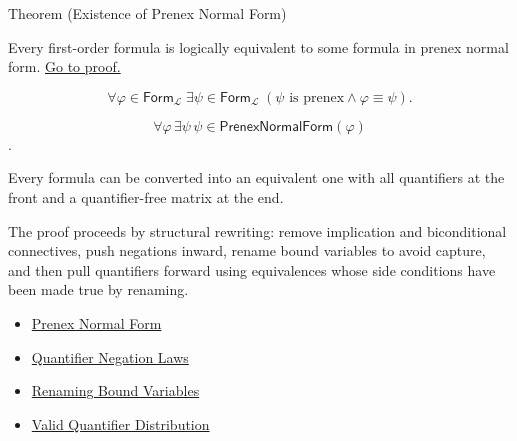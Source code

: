 \begin{theorembox}{Theorem (Existence of Prenex Normal Form)}
\begin{theorem}
\label{thm:pnf}
Every first-order formula is logically equivalent to some formula in prenex
normal form.
\hyperref[prf:pnf]{Go to proof.}
\end{theorem}
\end{theorembox}

\begin{remark*}
\[
\forall \varphi\in\mathsf{Form}_{\mathcal L}\;
\exists \psi\in\mathsf{Form}_{\mathcal L}\;
(\psi \text{ is prenex}\land \varphi\equiv\psi).
\]
\end{remark*}

\begin{remark*}
\[
\forall\varphi\,
\exists\psi\,\psi\in\mathsf{PrenexNormalForm}(\varphi)
\].
\end{remark*}

\begin{remark*}[Interpretation]
Every formula can be converted into an equivalent one with all quantifiers at
the front and a quantifier-free matrix at the end.
\end{remark*}

\begin{remark*}[Exposition]
The proof proceeds by structural rewriting: remove implication and
biconditional connectives, push negations inward, rename bound variables to
avoid capture, and then pull quantifiers forward using equivalences whose side
conditions have been made true by renaming.
\end{remark*}

\begin{dependencies}
\begin{itemize}
  \item \hyperref[def:pnf]{Prenex Normal Form}
  \item \hyperref[thm:qneg]{Quantifier Negation Laws}
  \item \hyperref[thm:rename]{Renaming Bound Variables}
  \item \hyperref[thm:qdist]{Valid Quantifier Distribution}
\end{itemize}
\end{dependencies}
